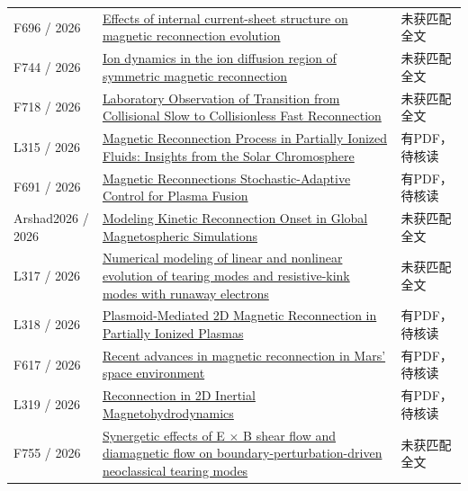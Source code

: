 \documentclass[UTF8,a4paper,11pt,openany,fontset=fandol]{ctexbook}
\begin{document}
\begin{longtable}{P{24mm}P{97mm}P{27mm}}
F696 / 2026 & \href{https://doi.org/10.1088/2058-6272/ae78b7}{Effects of internal current-sheet structure on magnetic reconnection evolution} & 未获匹配全文\\

F744 / 2026 & \href{https://doi.org/10.1063/5.0347826}{Ion dynamics in the ion diffusion region of symmetric magnetic reconnection} & 未获匹配全文\\

F718 / 2026 & \href{https://doi.org/10.1103/9l36-74my}{Laboratory Observation of Transition from Collisional Slow to Collisionless Fast Reconnection} & 未获匹配全文\\

L315 / 2026 & \href{https://doi.org/10.1007/s11207-026-02714-1}{Magnetic Reconnection Process in Partially Ionized Fluids: Insights from the Solar Chromosphere} & 有PDF，待核读\\

F691 / 2026 & \href{https://doi.org/10.21203/rs.3.rs-8443380/v1}{Magnetic Reconnections Stochastic-Adaptive Control for Plasma Fusion} & 有PDF，待核读\\

Arshad2026 / 2026 & \href{https://doi.org/10.1029/2026ja035547}{Modeling Kinetic Reconnection Onset in Global Magnetospheric Simulations} & 未获匹配全文\\

L317 / 2026 & \href{https://doi.org/10.1088/1741-4326/ae4e49}{Numerical modeling of linear and nonlinear evolution of tearing modes and resistive-kink modes with runaway electrons} & 未获匹配全文\\

L318 / 2026 & \href{https://doi.org/10.13140/rg.2.2.22493.17125}{Plasmoid-Mediated 2D Magnetic Reconnection in Partially Ionized Plasmas} & 有PDF，待核读\\

F617 / 2026 & \href{https://doi.org/10.1007/s11038-026-09597-z}{Recent advances in magnetic reconnection in Mars’ space environment} & 有PDF，待核读\\

L319 / 2026 & \href{https://doi.org/10.48550/arxiv.2610.23494}{Reconnection in 2D Inertial Magnetohydrodynamics} & 有PDF，待核读\\

F755 / 2026 & \href{https://doi.org/10.1088/1741-4326/ae3332}{Synergetic effects of E × B shear flow and diamagnetic flow on boundary-perturbation-driven neoclassical tearing modes} & 未获匹配全文\\


\end{longtable}
\end{document}
